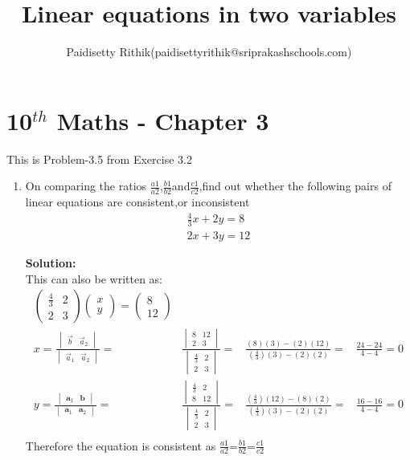 \documentclass[12pt]{article}
\title{Linear equations in two variables}
\author{Paidisetty Rithik(paidisettyrithik@sriprakashschools.com)}
\newcommand{\myvec}[1]{\ensuremath{\begin{pmatrix}#1\end{pmatrix}}}
\newcommand{\mydet}[1]{\ensuremath{\begin{vmatrix}#1\end{vmatrix}}}
\newcommand{\solution}{\noindent \textbf{Solution: }}
\let\vec\mathbf
\begin{document}
\maketitle
\section*{10$^{th}$ Maths - Chapter 3}
This is Problem-3.5 from Exercise 3.2
\begin{enumerate}
\item On comparing the ratios $\frac{a1}{a2}$,$\frac{b1}{b2}$and$\frac{c1}{c2}$,find out whether the following pairs of linear equations are consistent,or inconsistent\\
\begin{align}
    \frac{4}{3}x+2y=8\\
       2x+3y=12
\end{align}

\solution \\
This can also be written as:
\begin{align}
\myvec{\frac{4}{3}&2\\2&3}\myvec{x\\y} =\myvec{8\\12} \\
x=\frac{\mydet{\Vec{b} & \Vec{a}_2}}{\mydet{ \Vec{a}_1 & \Vec{a}_2}} =&
\frac{\mydet{ 8 & 12 \\ 2 & 3}}{\mydet{\frac{4}{3}&2\\2&3}}=&
\frac{(8)(3)-(2)(12)}{(\frac{4}{3})(3)-(2)(2)}=&
\frac{24-24}{4-4}=0\\
y=\frac{\mydet{\vec{a}_1&\vec{b}}}{\mydet{\vec{a}_1&\vec{a}_2}} =&
\frac{\mydet{\frac{4}{3}&2\\8&12}}{\mydet{\frac{4}{3}&2\\2&3}}=&
\frac{(\frac{4}{3})(12)-(8)(2)}{(\frac{4}{3})(3)-(2)(2)}=&
\frac{16-16}{4-4}=0\\    
\end{align}
Therefore the equation is consistent as $\frac{a1}{a2}$=$\frac{b1}{b2}$=$\frac{c1}{c2}$
	

\end{enumerate}
\end{document}
